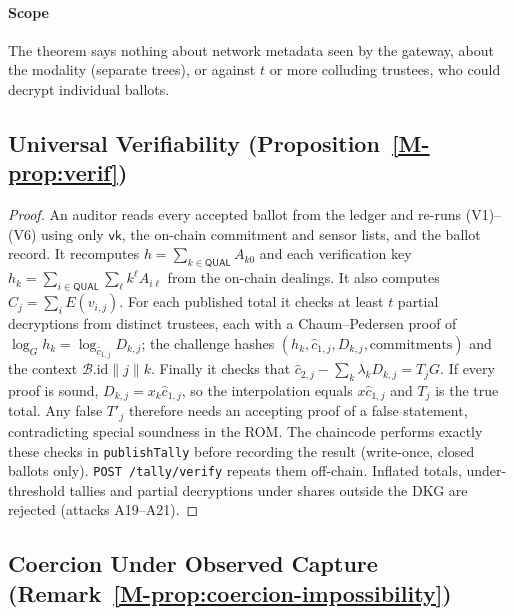 \documentclass[10pt,letterpaper,journal]{IEEEtran}
\begin{document}
\paragraph{Scope} The theorem says nothing about network metadata seen by the gateway, about the modality (separate trees), or against $t$ or more colluding trustees, who could decrypt individual ballots.

\subsection{Universal Verifiability (Proposition~\ref{M-prop:verif})}
\label{sec:supp-proof-verifiability}

\begin{proof}
An auditor reads every accepted ballot from the ledger and re-runs (V1)--(V6) using only $\mathsf{vk}$, the on-chain commitment and sensor lists, and the ballot record. It recomputes $h = \sum_{k\in\mathsf{QUAL}} A_{k0}$ and each verification key $h_k = \sum_{i\in\mathsf{QUAL}}\sum_\ell k^\ell A_{i\ell}$ from the on-chain dealings. It also computes $\hat{C}_j = \sum_i E(v_{i,j})$. For each published total it checks at least $t$ partial decryptions from distinct trustees, each with a Chaum--Pedersen proof of $\log_G h_k = \log_{\hat{c}_{1,j}} D_{k,j}$; the challenge hashes $(h_k, \hat{c}_{1,j}, D_{k,j}, \text{commitments})$ and the context $\mathcal{B}.\mathrm{id}\|j\|k$. Finally it checks that $\hat{c}_{2,j} - \sum_k \lambda_k D_{k,j} = T_jG$. If every proof is sound, $D_{k,j} = x_k\hat{c}_{1,j}$, so the interpolation equals $x\hat{c}_{1,j}$ and $T_j$ is the true total. Any false $T'_j$ therefore needs an accepting proof of a false statement, contradicting special soundness in the ROM. The chaincode performs exactly these checks in \texttt{publishTally} before recording the result (write-once, closed ballots only). \texttt{POST /tally/verify} repeats them off-chain. Inflated totals, under-threshold tallies and partial decryptions under shares outside the DKG are rejected (attacks A19--A21).
\end{proof}

\subsection{Coercion Under Observed Capture (Remark~\ref{M-prop:coercion-impossibility})}
\label{sec:supp-proof-coercion}
\end{document}
